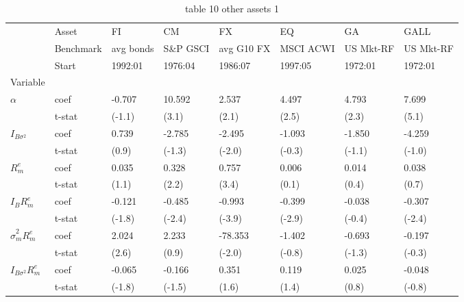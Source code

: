 \documentclass{article}
\begin{document}
\begin{table}[htbp]
  \centering
  \caption{table 10 other assets 1}
  \label{tab:table_10_other_assets_1}
  \begin{tabular}{llllllll}
\toprule
 & Asset & FI & CM & FX & EQ & GA & GALL \\
 & Benchmark & avg bonds & S\&P GSCI & avg G10 FX & MSCI ACWI & US Mkt-RF & US Mkt-RF \\
 & Start & 1992:01 & 1976:04 & 1986:07 & 1997:05 & 1972:01 & 1972:01 \\
Variable &  &  &  &  &  &  &  \\
\midrule
\multirow[t]{2}{*}{$\alpha$} & coef & -0.707 & 10.592 & 2.537 & 4.497 & 4.793 & 7.699 \\
 & t-stat & (-1.1) & (3.1) & (2.1) & (2.5) & (2.3) & (5.1) \\
\cline{1-8}
\multirow[t]{2}{*}{$I_{B\sigma^2}$} & coef & 0.739 & -2.785 & -2.495 & -1.093 & -1.850 & -4.259 \\
 & t-stat & (0.9) & (-1.3) & (-2.0) & (-0.3) & (-1.1) & (-1.0) \\
\cline{1-8}
\multirow[t]{2}{*}{$R^e_m$} & coef & 0.035 & 0.328 & 0.757 & 0.006 & 0.014 & 0.038 \\
 & t-stat & (1.1) & (2.2) & (3.4) & (0.1) & (0.4) & (0.7) \\
\cline{1-8}
\multirow[t]{2}{*}{$I_B R^e_m$} & coef & -0.121 & -0.485 & -0.993 & -0.399 & -0.038 & -0.307 \\
 & t-stat & (-1.8) & (-2.4) & (-3.9) & (-2.9) & (-0.4) & (-2.4) \\
\cline{1-8}
\multirow[t]{2}{*}{$\hat{\sigma}^2_m R^e_m$} & coef & 2.024 & 2.233 & -78.353 & -1.402 & -0.693 & -0.197 \\
 & t-stat & (2.6) & (0.9) & (-2.0) & (-0.8) & (-1.3) & (-0.3) \\
\cline{1-8}
\multirow[t]{2}{*}{$I_{B\sigma^2} R^e_m$} & coef & -0.065 & -0.166 & 0.351 & 0.119 & 0.025 & -0.048 \\
 & t-stat & (-1.8) & (-1.5) & (1.6) & (1.4) & (0.8) & (-0.8) \\
\cline{1-8}
\bottomrule
\end{tabular}
\end{table}
\end{document}
